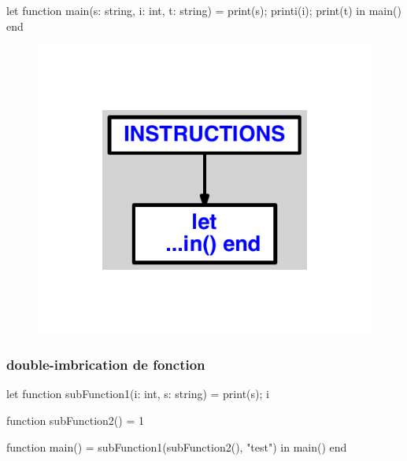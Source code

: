 \documentclass{article}
\begin{document}
\begin{verbatimtab}
let
	function main(s: string, i: int, t: string) =
		print(s);
		printi(i);
		print(t)
in main() end
\end{verbatimtab}
\begin{figure}[H]\centering\includegraphics[max width=\textwidth]{ast/ast_234.pdf}\end{figure}\subsubsection{double-imbrication de fonction}
\begin{verbatimtab}
let
	function subFunction1(i: int, s: string) =
		print(s);
		i

	function subFunction2() = 1

	function main() = subFunction1(subFunction2(), "test")
in main() end
\end{verbatimtab}
\end{document}
